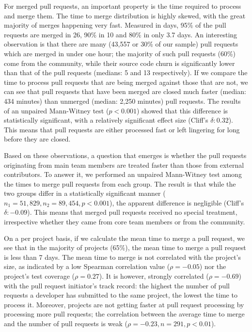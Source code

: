 \documentclass{sig-alternate}
\begin{document}
For merged pull requests, an important property is the time required to process
and merge them. The time to merge distribution is highly skewed, with the great
majority of merges happening very fast. Measured in days, 95\% of the pull
requests are merged in 26, 90\% in 10 and 80\% in only 3.7 days. An interesting
observation is that there are many (43,557 or 30\% of our sample) pull requests
which are merged in under one hour; the majority of such pull requests (60\%)
come from the community, while their source code churn is significantly lower
than that of the pull requests (medians: 5 and 13 respectively). If we compare
the time to process pull requests that are being merged against those that are
not, we can see that pull requests that have been merged are closed much faster
(median: 434 minutes) than unmerged (median: 2,250 minutes) pull requests.  The
results of an unpaired Mann-Witney test ($p < 0.001$) showed that this
difference is statistically significant, with a relatively significant effect
size (Cliff's $\delta: 0.32$). This means that pull requests are either
processed fast or left lingering for long before they are closed.

Based on these observations, a question that emerges is whether the pull
requests originating from main team members are treated faster than those from
external contributors. To answer it, we performed an unpaired Mann-Witney test
among the times to merge pull requests from each group. The result is that while
the two groups differ in a statistically significant manner ($n_1 = 51,829, n_2
= 89,454, p < 0.001$), the apparent difference is negligible (Cliff's $\delta:
-0.09$). This means that merged pull requests received no special treatment,
irrespective whether they came from core team members or from the community.

On a per project basis, if we calculate the mean time to merge a pull request,
we see that in the majority of projects (65\%), the mean time to merge a pull
request is less than 7 days. The mean time to merge
is not correlated with the project's size, as indicated by a low Spearman
correlation value ($\rho = -0.05$) nor the project's test coverage ($\rho =
0.27$). It is however, strongly correlated ($\rho = -0.69$) with the pull
request initiator's track record: the highest the number of pull requests a
developer has submitted to the same project, the lowest the time to process it.
Moreover, projects are not getting faster at pull request processing by
processing more pull requests; the correlation between the average time to merge
and the number of pull requests is weak ($\rho = -0.23, n = 291, p < 0.01$).
\end{document}
